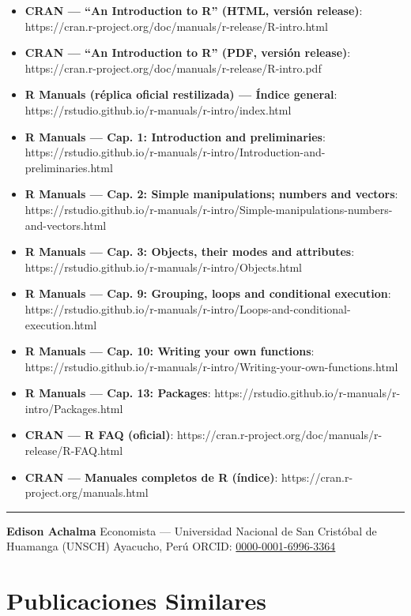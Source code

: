 \documentclass[
  jou,
  floatsintext,
  longtable,
  a4paper,
  nolmodern,
  notxfonts,
  notimes,
  12pt,
  colorlinks=true,linkcolor=blue,citecolor=blue,urlcolor=blue]{apa7}
\providecommand{\tightlist}{%
  \setlength{\itemsep}{0pt}\setlength{\parskip}{0pt}}
\begin{document}
\begin{itemize}
\tightlist
\item
  \textbf{CRAN --- ``An Introduction to R'' (HTML, versión release)}:
  https://cran.r-project.org/doc/manuals/r-release/R-intro.html
\item
  \textbf{CRAN --- ``An Introduction to R'' (PDF, versión release)}:
  https://cran.r-project.org/doc/manuals/r-release/R-intro.pdf
\item
  \textbf{R Manuals (réplica oficial restilizada) --- Índice general}:
  https://rstudio.github.io/r-manuals/r-intro/index.html
\item
  \textbf{R Manuals --- Cap. 1: Introduction and preliminaries}:
  https://rstudio.github.io/r-manuals/r-intro/Introduction-and-preliminaries.html
\item
  \textbf{R Manuals --- Cap. 2: Simple manipulations; numbers and
  vectors}:
  https://rstudio.github.io/r-manuals/r-intro/Simple-manipulations-numbers-and-vectors.html
\item
  \textbf{R Manuals --- Cap. 3: Objects, their modes and attributes}:
  https://rstudio.github.io/r-manuals/r-intro/Objects.html
\item
  \textbf{R Manuals --- Cap. 9: Grouping, loops and conditional
  execution}:
  https://rstudio.github.io/r-manuals/r-intro/Loops-and-conditional-execution.html
\item
  \textbf{R Manuals --- Cap. 10: Writing your own functions}:
  https://rstudio.github.io/r-manuals/r-intro/Writing-your-own-functions.html
\item
  \textbf{R Manuals --- Cap. 13: Packages}:
  https://rstudio.github.io/r-manuals/r-intro/Packages.html
\item
  \textbf{CRAN --- R FAQ (oficial)}:
  https://cran.r-project.org/doc/manuals/r-release/R-FAQ.html
\item
  \textbf{CRAN --- Manuales completos de R (índice)}:
  https://cran.r-project.org/manuals.html
\end{itemize}

\begin{center}\rule{0.5\linewidth}{0.5pt}\end{center}

\textbf{Edison Achalma} Economista --- Universidad Nacional de San
Cristóbal de Huamanga (UNSCH) Ayacucho, Perú ORCID:
\href{https://orcid.org/0000-0001-6996-3364}{0000-0001-6996-3364}

\section{Publicaciones Similares}\label{publicaciones-similares}
\end{document}
